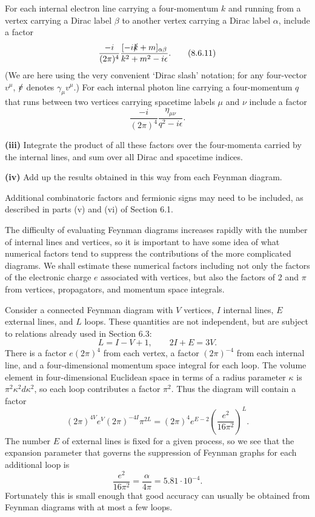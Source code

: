 For each internal electron line carrying a four-momentum $k$ and running from
a vertex carrying a Dirac label $\beta$ to another vertex carrying a Dirac
label $\alpha$, include a factor
\begin{equation}
\frac{-i}{(2\pi)^4}
\frac{[-i\sl{k}+m]_{\alpha\beta}}{k^2+m^2-i\epsilon}.
\tag{8.6.11}\label{eq:8.6.11}
\end{equation}
(We are here using the very convenient `Dirac slash' notation; for any
four-vector $v^\mu$, $\sl{v}$ denotes $\gamma_\mu v^\mu$.) For each
internal photon line carrying a four-momentum $q$ that runs between two
vertices carrying spacetime labels $\mu$ and $\nu$ include a factor
\begin{equation}
\frac{-i}{(2\pi)^4}\frac{\eta_{\mu\nu}}{q^2-i\epsilon}.
\tag{8.6.12}\label{eq:8.6.12}
\end{equation}

\medskip
\noindent\textbf{(iii)} Integrate the product of all these factors over the
four-momenta carried by the internal lines, and sum over all Dirac and
spacetime indices.

\medskip
\noindent\textbf{(iv)} Add up the results obtained in this way from each
Feynman diagram.

Additional combinatoric factors and fermionic signs may need to be included,
as described in parts (v) and (vi) of Section 6.1.

The difficulty of evaluating Feynman diagrams increases rapidly with the
number of internal lines and vertices, so it is important to have some idea of
what numerical factors tend to suppress the contributions of the more
complicated diagrams. We shall estimate these numerical factors including not
only the factors of the electronic charge $e$ associated with vertices, but
also the factors of 2 and $\pi$ from vertices, propagators, and momentum space
integrals.

Consider a connected Feynman diagram with $V$ vertices, $I$ internal lines,
$E$ external lines, and $L$ loops. These quantities are not independent, but
are subject to relations already used in Section 6.3:
\[
L=I-V+1,\qquad 2I+E=3V.
\]
There is a factor $e(2\pi)^4$ from each vertex, a factor $(2\pi)^{-4}$
from each internal line, and a four-dimensional momentum space integral for
each loop. The volume element in four-dimensional Euclidean space in terms of
a radius parameter $\kappa$ is $\pi^2\kappa^2d\kappa^2$, so each loop
contributes a factor $\pi^2$. Thus the diagram will contain a factor
\[
(2\pi)^{4V}e^V(2\pi)^{-4I}\pi^{2L}
=(2\pi)^4e^{E-2}\left(\frac{e^2}{16\pi^2}\right)^L.
\]
The number $E$ of external lines is fixed for a given process, so we see that
the expansion parameter that governs the suppression of Feynman graphs for
each additional loop is
\[
\frac{e^2}{16\pi^2}=\frac{\alpha}{4\pi}=5.81\cdot10^{-4}.
\]
Fortunately this is small enough that good accuracy can usually be obtained
from Feynman diagrams with at most a few loops.

